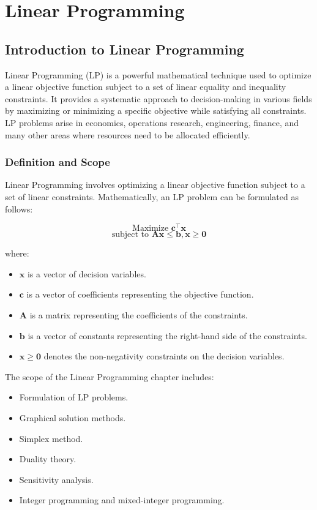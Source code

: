 \documentclass[12pt]{book} %
\begin{document}
\chapter{Linear Programming}

\section{Introduction to Linear Programming}

Linear Programming (LP) is a powerful mathematical technique used to optimize a linear objective function subject to a set of linear equality and inequality constraints. It provides a systematic approach to decision-making in various fields by maximizing or minimizing a specific objective while satisfying all constraints. LP problems arise in economics, operations research, engineering, finance, and many other areas where resources need to be allocated efficiently.

\subsection{Definition and Scope}

Linear Programming involves optimizing a linear objective function subject to a set of linear constraints. Mathematically, an LP problem can be formulated as follows:

\[
\text{Maximize } \mathbf{c}^\top \mathbf{x}
\]
\[
\text{subject to } \mathbf{Ax} \leq \mathbf{b}, \mathbf{x} \geq \mathbf{0}
\]

where:
\begin{itemize}
    \item $\mathbf{x}$ is a vector of decision variables.
    \item $\mathbf{c}$ is a vector of coefficients representing the objective function.
    \item $\mathbf{A}$ is a matrix representing the coefficients of the constraints.
    \item $\mathbf{b}$ is a vector of constants representing the right-hand side of the constraints.
    \item $\mathbf{x} \geq \mathbf{0}$ denotes the non-negativity constraints on the decision variables.
\end{itemize}

The scope of the Linear Programming chapter includes:

\begin{itemize}
    \item Formulation of LP problems.
    \item Graphical solution methods.
    \item Simplex method.
    \item Duality theory.
    \item Sensitivity analysis.
    \item Integer programming and mixed-integer programming.
\end{itemize}
\end{document}
